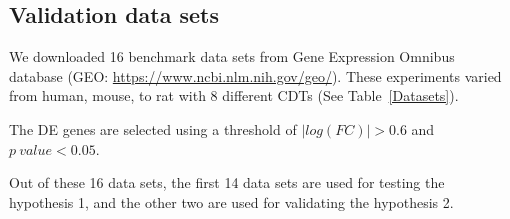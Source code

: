 \subsection{Validation data sets}

We downloaded 16 benchmark data sets from Gene Expression Omnibus database (GEO: \url{https://www.ncbi.nlm.nih.gov/geo/}). 
These experiments varied from human, mouse, to rat with 8 different CDTs (See Table~\ref{Datasets}).

The DE genes are selected using a threshold of $|log(FC)| > 0.6$ and $p\ value < 0.05$.

Out of these 16 data sets, the first 14 data sets are used for testing the hypothesis 1, and the other two are used for validating the hypothesis 2.


